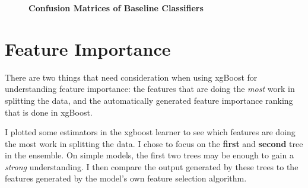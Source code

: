 \begin{figure}[!hbtp]

    \caption{\textbf{Confusion Matrices of Baseline Classifiers}}
\end{figure}

\section*{Feature Importance}
There are two things that need consideration when using xgBoost for understanding feature importance: the features that are doing the \emph{most} work in splitting the data, and the automatically generated feature importance ranking that is done in xgBoost.

I plotted some estimators in the xgboost learner to see which features are doing the most work in splitting the data. I chose to focus on the \textbf{first} and \textbf{second} tree in the ensemble. On simple models, the first two trees may be enough to gain a \textit{strong} understanding. I then compare the output generated by these trees to the features generated by the model's own feature selection algorithm. 

